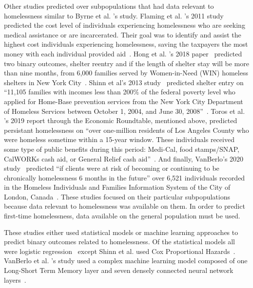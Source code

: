 \documentclass[10pt,letterpaper]{article}
\begin{document}
Other studies predicted over subpopulations that had data relevant to homelessness similar to Byrne et al. 's study. Flaming et al. 's 2011 study~\cite{flaming2011crisis} predicted the cost level of individuals experiencing homelessness who are seeking medical assistance or are incarcerated. Their goal was to identify and assist the highest cost individuals experiencing homelessness, saving the taxpayers the most money with each individual provided aid~\cite{flaming2011crisis}. Hong et al. 's 2018 paper~\cite{hong2018applications} predicted two binary outcomes, shelter reentry and if the length of shelter stay will be more than nine months, from 6,000 families served by Women-in-Need (WIN) homeless shelters in New York City~\cite{hong2018applications}. Shinn et al's 2013 study~\cite{shinn2013efficient} predicted shelter entry on ``11,105 families with incomes less than 200\% of the federal poverty level who applied for Home-Base prevention services from the New York City Department of Homeless Services between October 1, 2004, and June 30, 2008''~\cite{shinn2013efficient}. Toros et al. 's 2019 report through the Economic Roundtable, mentioned above, predicted persistant homelessness on ``over one-million residents of Los Angeles County who were homeless sometime within a 15-year window. These  individuals received some type of public benefits during this period: Medi-Cal, food  stamps/SNAP, CalWORKs cash aid, or General Relief cash aid''~\cite{toros2019early}. And finally, VanBerlo's 2020 study~\cite{vanberlo2021interpretable} predicted ``if clients were at risk of becoming or continuing to be chronically homelessness 6 months in the future'' over 6,521 individuals recorded in the Homeless Individuals and Families Information System of the City of London, Canada~\cite{vanberlo2021interpretable}. These studies focused on their particular subpopulations because data relevant to homelessness was available on them. In order to predict first-time homelessness, data available on the general population must be used.

These studies either used statistical models or machine learning approaches to predict binary outcomes related to homelessness. Of the statistical models all were logistic regression~\cite{byrne2020classification,flaming2011crisis,hong2018applications,toros2019early} except Shinn et al. used Cox Proportional Hazards~\cite{shinn2013efficient}. VanBerlo et al. 's study used a complex machine learning model composed of one Long-Short Term Memory layer and seven densely connected neural network layers~\cite{vanberlo2021interpretable}. 
\end{document}
